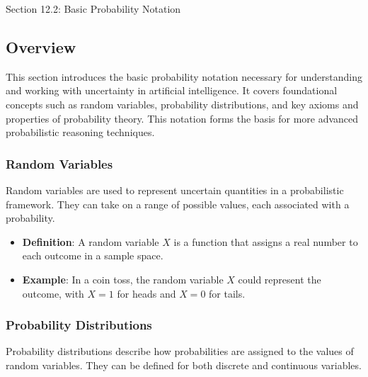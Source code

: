 \begin{notes}{Section 12.2: Basic Probability Notation}
    \subsection*{Overview}

    This section introduces the basic probability notation necessary for understanding and working with uncertainty in artificial intelligence. It covers foundational concepts such as random variables, 
    probability distributions, and key axioms and properties of probability theory. This notation forms the basis for more advanced probabilistic reasoning techniques.
    
    \subsubsection*{Random Variables}
    
    Random variables are used to represent uncertain quantities in a probabilistic framework. They can take on a range of possible values, each associated with a probability.
    
    \begin{highlight}
    
        \begin{itemize}
            \item \textbf{Definition}: A random variable $X$ is a function that assigns a real number to each outcome in a sample space.
            \item \textbf{Example}: In a coin toss, the random variable $X$ could represent the outcome, with $X = 1$ for heads and $X = 0$ for tails.
        \end{itemize}
    
    \end{highlight}
    
    \subsubsection*{Probability Distributions}
    
    Probability distributions describe how probabilities are assigned to the values of random variables. They can be defined for both discrete and continuous variables.
    
    \begin{highlight}
    

\end{highlight}
\end{notes}
